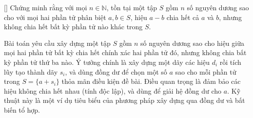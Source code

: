 \documentclass[../09-contruction-methods.tex]{subfiles}
\begin{document}
\begin{example*}\label{example:USA-2015-TST-P2}[\textbf{}]
    Chứng minh rằng với mọi \( n \in \mathbb{N} \), tồn tại một tập \( S \) gồm \( n \) số nguyên dương sao cho với mọi hai phần tử phân biệt \( a, b \in S \),
    hiệu \( a - b \) chia hết cả \( a \) và \( b \), nhưng không chia hết bất kỳ phần tử nào khác trong \( S \).
\end{example*}

\begin{story*}
    Bài toán yêu cầu xây dựng một tập \( S \) gồm \( n \) số nguyên dương sao cho hiệu giữa mọi hai phần tử bất kỳ chia hết chính xác hai phần tử đó,
    nhưng không chia bất kỳ phần tử thứ ba nào. Ý tưởng chính là xây dựng một dãy các hiệu \( d_i \) rồi tích lũy tạo thành dãy \( s_i \),
    và dùng đồng dư để chọn một số \( a \) sao cho mỗi phần tử trong \( S = \{ a + s_i \} \) thỏa mãn điều kiện đề bài.
    Điều quan trọng là đảm bảo các hiệu không chia hết nhau (tính độc lập), và dùng  để giải hệ đồng dư cho \( a \).
    Kỹ thuật này là một ví dụ tiêu biểu của phương pháp xây dựng qua đồng dư và bất biến tổ hợp.
\end{story*}
\end{document}
